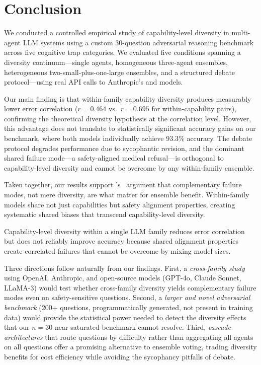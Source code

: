 \section{Conclusion}
\label{sec:conclusion}

We conducted a controlled empirical study of capability-level diversity in
multi-agent LLM systems using a custom 30-question adversarial reasoning benchmark
across five cognitive trap categories.
We evaluated five conditions spanning a diversity continuum---single agents,
homogeneous three-agent ensembles, heterogeneous two-small-plus-one-large ensembles,
and a structured debate protocol---using real API calls to Anthropic's
\haiku and \sonnet models.

Our main finding is that within-family capability diversity produces measurably
lower error correlation ($r{=}0.464$ vs.\ $r{=}0.695$ for within-capability pairs),
confirming the theoretical diversity hypothesis at the correlation level.
However, this advantage does not translate to statistically significant accuracy gains
on our benchmark, where both models individually achieve 93.3\% accuracy.
The debate protocol degrades performance due to sycophantic revision,
and the dominant shared failure mode---a safety-aligned medical refusal---is
orthogonal to capability-level diversity and cannot be overcome by any within-family ensemble.

Taken together, our results support \citeauthor{rosales2025diverse}'s~\citeyearpar{rosales2025diverse}
argument that complementary failure modes, not mere diversity, are what matter for ensemble benefit.
Within-family models share not just capabilities but safety alignment properties,
creating systematic shared biases that transcend capability-level diversity.

Capability-level diversity within a single LLM family reduces error correlation
but does not reliably improve accuracy because shared alignment properties create
correlated failures that cannot be overcome by mixing model sizes.

Three directions follow naturally from our findings.
First, a \emph{cross-family study} using OpenAI, Anthropic, and open-source models
(GPT-4o, Claude Sonnet, LLaMA-3) would test whether cross-family diversity
yields complementary failure modes even on safety-sensitive questions.
Second, a \emph{larger and novel adversarial benchmark} (200+ questions,
programmatically generated, not present in training data) would provide
the statistical power needed to detect the diversity effects that our
$n{=}30$ near-saturated benchmark cannot resolve.
Third, \emph{cascade architectures} that route questions by difficulty
rather than aggregating all agents on all questions offer a promising
alternative to ensemble voting, trading diversity benefits for cost efficiency
while avoiding the sycophancy pitfalls of debate.
